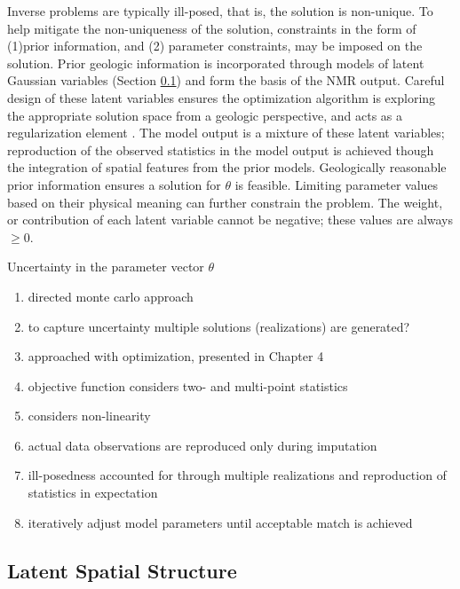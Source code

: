 Inverse problems are typically ill-posed, that is, the solution is non-unique. To help mitigate the non-uniqueness of the solution, constraints in the form of (1)prior information, and (2) parameter constraints, may be imposed on the solution. Prior geologic information is incorporated through models of latent Gaussian variables (Section \ref{subsec:03latent}) and form the basis of the \gls{NMR} output. Careful design of these latent variables ensures the optimization algorithm is exploring the appropriate solution space from a geologic perspective, and acts as a regularization element \citep{zhou2014inverse}. The model output is a mixture of these latent variables; reproduction of the observed statistics in the model output is achieved though the integration of spatial features from the prior models. Geologically reasonable prior information ensures a solution for $\theta$ is feasible. Limiting parameter values based on their physical meaning can further constrain the problem. The weight, or contribution of each latent variable cannot be negative; these values are always $\geq 0$.



Uncertainty in the parameter vector $\theta$


\begin{enumerate}
    \item directed monte carlo approach
    \item to capture uncertainty multiple solutions (realizations) are generated?
    \item approached with optimization, presented in Chapter 4
    \item objective function considers two- and multi-point statistics
    \item considers non-linearity
    \item actual data observations are reproduced only during imputation
    \item ill-posedness accounted for through multiple realizations and reproduction of statistics in expectation
    \item iteratively adjust model parameters until acceptable match is achieved
\end{enumerate}


\FloatBarrier
\subsection{Latent Spatial Structure}
\label{subsec:03latent}


